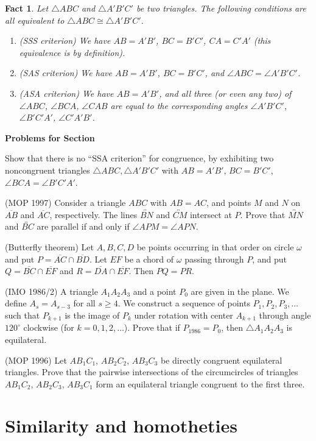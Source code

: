 \documentclass[12pt]{book}
\newcounter{exc}
\numberwithin{exc}{section}
\numberwithin{figure}{section}
\newenvironment{exer}{\vspace{0.1in}
\noindent \textbf{Problems for Section~\thesection} \vspace{0.1in}
\begin{list}{\arabic{exc}.}{\usecounter{exc}}}{\end{list}}
\newtheorem{fact}[theorem]{Fact}
\numberwithin{equation}{theorem}
\def\ii{\item}
\def\ang{\angle}
\def\line#1{\overleftrightarrow{#1}}
\def\seg#1{\overline{#1}}
\begin{document}
\begin{fact}
Let $\triangle ABC$ and $\triangle A'B'C'$ be two triangles. The following conditions are
all equivalent to $\triangle ABC \cong \triangle A'B'C'$.
\begin{enumerate}
\item[(a)] (SSS criterion) We have $AB = A'B'$, $BC = B'C'$, $CA = C'A'$
(this equivalence is by definition).
\item[(b)] (SAS criterion) We have $AB = A'B'$, $BC = B'C'$, and
$\angle ABC = \angle A'B'C'$.
\item[(c)] (ASA criterion) We have $AB = A'B'$, and all three (or even any two) of $\ang ABC$, $\ang BCA$, $\ang CAB$ are equal to the corresponding
angles $\ang A'B'C'$, $\ang B'C'A'$, $\ang C'A'B'$.
\end{enumerate}
\end{fact}

\begin{exer}
\ii
Show that there is no ``SSA criterion'' for congruence, by exhibiting
two noncongruent triangles $\triangle ABC, \triangle A'B'C'$ with
$AB=A'B'$, $BC = B'C'$, $\angle BCA = \angle B'C'A'$.
\ii
(MOP 1997)
Consider a triangle $ABC$ with $AB = AC$, and points $M$ and $N$ on
$\seg{AB}$ and $\seg{AC}$, respectively. The lines $\line{BN}$ and $\line{CM}$ 
intersect at $P$.
Prove that $\line{MN}$ and $\line{BC}$ are parallel if and only if 
$\ang APM = \ang APN$.
\item (Butterfly theorem)
Let $A,B,C,D$ be points occurring in that order on circle $\omega$ and
put $P = \seg{AC} \cap \seg{BD}$. 
Let $EF$ be a chord of $\omega$ passing through $P$,
and put $Q = \seg{BC} \cap \seg{EF}$ and $R = \seg{DA} \cap \seg{EF}$. 
Then $PQ = PR$.
\ii
(IMO 1986/2)
A triangle $A_1A_2A_3$ and a point $P_0$ are given in the plane. We
define $A_s = A_{s-3}$ for all $s \geq 4$. We construct a sequence of
points $P_1, P_2, P_3, \dots$ such that $P_{k+1}$ is the image of $P_k$
under rotation with center $A_{k+1}$ through angle $120^\circ$
clockwise (for $k=0,1,2,\dots$). Prove that if $P_{1986} = P_0$, then
$\triangle A_1A_2A_3$ is equilateral.
\ii (MOP 1996) \label{ex:threeeq}
Let $AB_1C_1$, $AB_2C_2$, $AB_3C_3$ be directly congruent equilateral
triangles. Prove that the pairwise intersections of the circumcircles
of triangles $AB_1C_2$, $AB_2C_3$, $AB_3C_1$ form an equilateral triangle
congruent to the first three. 
\end{exer}

\section{Similarity and homotheties}
\end{document}
